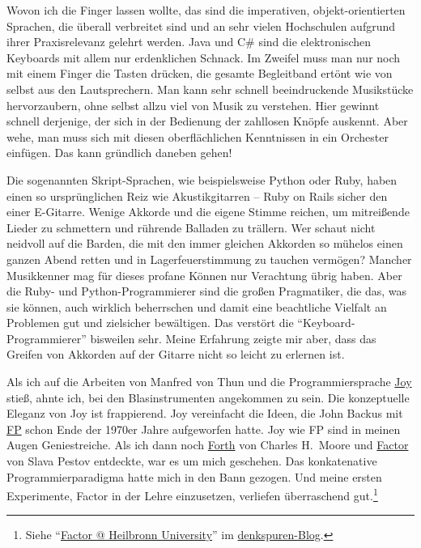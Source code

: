 Wovon ich die Finger lassen wollte, das sind die imperativen, objekt-orientierten Sprachen, die überall verbreitet sind und an sehr vielen Hochschulen aufgrund ihrer Praxisrelevanz gelehrt werden. Java und C\# sind die elektronischen Keyboards mit allem nur erdenklichen Schnack. Im Zweifel muss man nur noch mit einem Finger die Tasten drücken, die gesamte Begleitband ertönt wie von selbst aus den Lautsprechern. Man kann sehr schnell beeindruckende Musikstücke hervorzaubern, ohne selbst allzu viel von Musik zu verstehen. Hier gewinnt schnell derjenige, der sich in der Bedienung der zahllosen Knöpfe auskennt. Aber wehe, man muss sich mit diesen oberflächlichen Kenntnissen in ein Orchester einfügen. Das kann gründlich daneben gehen!

Die sogenannten Skript-Sprachen, wie beispielsweise Python oder Ruby, haben einen so ursprünglichen Reiz wie Akustikgitarren -- Ruby on Rails sicher den einer E-Gitarre. Wenige Akkorde und die eigene Stimme reichen, um mitreißende Lieder zu schmettern und rührende Balladen zu trällern. Wer schaut nicht neidvoll auf die Barden, die mit den immer gleichen Akkorden so mühelos einen ganzen Abend retten und in Lagerfeuerstimmung zu tauchen vermögen? Mancher Musikkenner mag für dieses profane Können nur Verachtung übrig haben. Aber die Ruby- und Python-Programmierer sind die großen Pragmatiker, die das, was sie können, auch wirklich beherrschen und damit eine beachtliche Vielfalt an Problemen gut und zielsicher bewältigen. Das verstört die "`Keyboard-Programmierer"' bisweilen sehr. Meine Erfahrung zeigte mir aber, dass das Greifen von Akkorden auf der Gitarre nicht so leicht zu erlernen ist.

Als ich auf die Arbeiten von {\sc Manfred von Thun} und die Programmiersprache \href{http://www.latrobe.edu.au/phimvt/joy.html}{Joy} stieß, ahnte ich, bei den Blasinstrumenten angekommen zu sein. Die konzeptuelle Eleganz von Joy ist frappierend. Joy vereinfacht die Ideen, die {\sc John Backus} mit \href{http://de.wikipedia.org/wiki/Functional\_Programming\_System}{FP} schon Ende der 1970er Jahre aufgeworfen hatte. Joy wie FP sind in meinen Augen Geniestreiche. Als ich dann noch \href{http://de.wikipedia.org/wiki/Forth\_(Informatik)}{Forth} von {\sc Charles H.\ Moore} und \href{http://factorcode.org}{Factor} von {\sc Slava Pestov} entdeckte, war es um mich geschehen. Das konkatenative Programmierparadigma hatte mich in den Bann gezogen. Und meine ersten Experimente, Factor in der Lehre einzusetzen, verliefen überraschend gut.\footnote{Siehe "`\href{http://denkspuren.blogspot.de/2010/01/factor-heilbronn-university.html}{Factor @ Heilbronn University}"' im \href{http://denkspuren.blogspot.de}{denkspuren-Blog}.}

